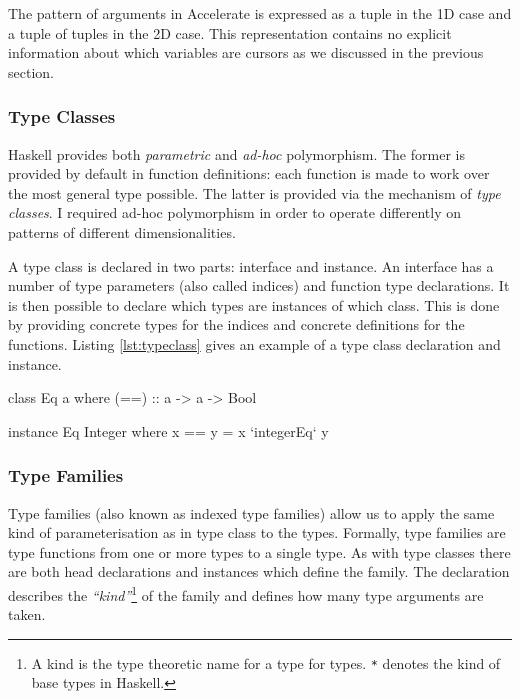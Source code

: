 \documentclass[
    12pt,
    a4paper,
    twoside,
    openright,
    ]{scrbook}
\begin{document}
The pattern of arguments in Accelerate is expressed as a tuple in the 1D case
and a tuple of tuples in the 2D case. This representation contains no explicit
information about which variables are cursors as we discussed in the previous
section.

\subsubsection{Type Classes}
\label{sec:typeclasses}

Haskell provides both \emph{parametric} and \emph{ad-hoc} polymorphism. The
former is provided by default in function definitions: each function is made to
work over the most general type possible. The latter is provided via the
mechanism of \emph{type classes}.  I required ad-hoc polymorphism in order to
operate differently on patterns of different dimensionalities.

A type class is declared in two parts: interface and instance. An interface has
a number of type parameters (also called indices) and function type
declarations. It is then possible to declare which types are instances of which
class. This is done by providing concrete types for the indices and concrete
definitions for the functions. Listing \ref{lst:typeclass} gives an example of a
type class declaration and instance.

\begin{hflisting}[label=lst:typeclass, caption={An example type class for
    equality. Showing the declaration and the instance for integers. Where
    \texttt{integerEq} is the implementation of integer equality on the target
    machine.}]

class Eq a where
  (==) :: a -> a -> Bool

instance Eq Integer where
  x == y =  x `integerEq` y

\end{hflisting}

\subsubsection{Type Families}
\label{sec:typefam}

Type families (also known as indexed type families) allow us to apply the same
kind of parameterisation as in type class to the
types\cite{chakravarty05}. Formally, type families are type functions from one
or more types to a single type. As with type classes there are both head
declarations and instances which define the family. The declaration describes
the \emph{``kind''}\footnote{A kind is the type theoretic name for a type for
  types. \texttt{*} denotes the kind of base types in Haskell.} of the family
and defines how many type arguments are taken.
\end{document}
